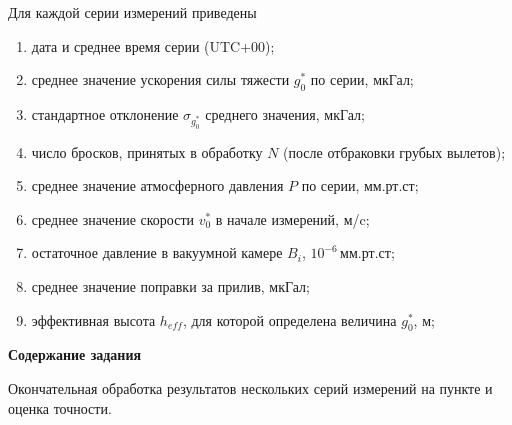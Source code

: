 \documentclass[12pt, a4paper]{article}
\theoremstyle{remark}
\begin{document}
Для каждой серии измерений приведены
\begin{enumerate}
    \item дата и среднее время серии (UTC+00);
    \item среднее значение ускорения силы тяжести $g^*_0$ по серии, мкГал;
    \item стандартное отклонение $\sigma_{g^*_0}$ среднего значения, мкГал;
    \item число бросков, принятых в обработку $N$ (после отбраковки грубых вылетов);
    \item среднее значение атмосферного давления $P$ по серии, мм.рт.ст;
    \item среднее значение скорости $v_0^*$ в начале измерений, м/c;
    \item остаточное давление в вакуумной камере $B_i$, $10^{-6}\,\text{мм.рт.ст}$;
    \item среднее значение поправки за прилив, мкГал;
    \item эффективная высота $h_{eff}$, для которой определена величина $g^*_0$, м;
\end{enumerate}

\begin{center}
    \textbf{Содержание задания}
\end{center}
Окончательная обработка результатов нескольких серий измерений на пункте и оценка точности.
\end{document}

